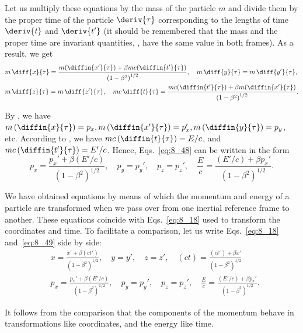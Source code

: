 Let us multiply these equations by the mass of the particle $m$ and divide them by the proper time of the particle $\deriv{\tau}$ corresponding to the lengths of time $\deriv{t}$ and $\deriv{t'}$ (it should be remembered that the mass and the proper time are invariant quantities, \ie, have the same value in both frames). As a result, we get
\begin{equation}\label{eq:8_48}
	\begin{split}
	&m\,\diff{x}{\tau} = \frac{m(\diffin{x'}{\tau})+\beta mc(\diffin{t'}{\tau})}{\left(1 - \beta^2\right)^{1/2}},\quad m\,\diff{y}{\tau} = m\,\diff{y'}{\tau},\\
	&m\,\diff{z}{\tau} = m\,\diff{z'}{\tau},\quad mc\,\diff{t}{\tau} = \frac{mc(\diffin{t'}{\tau})+\beta m(\diffin{x'}{\tau})}{\left(1 - \beta^2\right)^{1/2}}.
	\end{split}
\end{equation}

By , we have $m\,(\diffin{x}{\tau})=p_x, m\,(\diffin{x'}{\tau})=p_x', m\,(\diffin{y}{\tau})=p_y$, etc. According to , we have $mc\,(\diffin{t}{\tau})=E/c$, and $mc\,(\diffin{t'}{\tau})=E'/c$. Hence, Eqs.~\eqref{eq:8_48} can be written in the form
\begin{equation}\label{eq:8_49}
	p_x = \frac{p_x'+\beta(E'/c)}{\left(1 - \beta^2\right)^{1/2}},\quad p_y = p_y',\quad p_z = p_z',\quad \frac{E}{c} = \frac{(E'/c)+\beta p_x'}{\left(1 - \beta^2\right)^{1/2}}.
\end{equation}

We have obtained equations by means of which the momentum and energy of a particle are transformed when we pass over from one inertial reference frame to another. These equations coincide with Eqs.~\eqref{eq:8_18} used to transform the coordinates and time. To facilitate a comparison, let us write Eqs.~\eqref{eq:8_18} and~\eqref{eq:8_49} side by side:
\begin{equation}\label{eq:8_50}
	\begin{split}
		&x = \frac{x'+\beta(ct')}{\left(1 - \beta^2\right)^{1/2}},\quad y=y',\quad z=z',\quad (ct) = \frac{(ct')+\beta x'}{\left(1 - \beta^2\right)^{1/2}}\\
		&p_x = \frac{p_x'+\beta(E'/c)}{\left(1 - \beta^2\right)^{1/2}},\quad p_y = p_y',\quad p_z = p_z',\quad \frac{E}{c} = \frac{(E'/c)+\beta p_x'}{\left(1 - \beta^2\right)^{1/2}}.
	\end{split}
\end{equation}

\noindent
It follows from the comparison that the components of the momentum behave in transformations like coordinates, and the energy like time.

